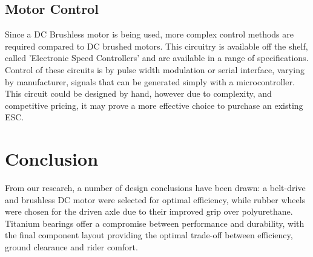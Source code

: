 \documentclass[journal,10pt]{IEEEtran}
\begin{document}
    \subsection{Motor Control}
    		Since a DC Brushless motor is being used, more complex control methods are required compared to DC brushed motors.
    		This circuitry is available off the shelf, called 'Electronic Speed Controllers' and are available in a range of specifications.
    		Control of these circuits is by pulse width modulation or serial interface, varying by manufacturer, signals that can be generated simply with a microcontroller.
    		This circuit could be designed by hand, however due to complexity, and competitive pricing, it may prove a more effective choice to purchase an existing ESC.
\section{Conclusion}
From our research, a number of design conclusions have been drawn: a belt-drive and brushless DC motor were selected for optimal efficiency, while rubber wheels were chosen for the driven axle due to their improved grip over polyurethane. Titanium bearings offer a compromise between performance and durability, with the final component layout providing the optimal trade-off between efficiency, ground clearance and rider comfort.



\end{document}
